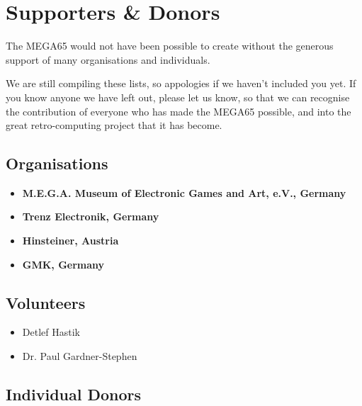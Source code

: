 \chapter{Supporters \& Donors}

The MEGA65 would not have been possible to create without the generous support
of many organisations and individuals.

We are still compiling these lists, so appologies if we haven't included you yet.  If you
know anyone we have left out, please let us know, so that we can recognise the contribution
of everyone who has made the MEGA65 possible, and into the great retro-computing project
that it has become.

\section{Organisations}

\begin{itemize}
\item {\bf M.E.G.A. Museum of Electronic Games and Art, e.V., Germany} 
\item {\bf Trenz Electronik, Germany} 
\item {\bf Hinsteiner, Austria} 
\item {\bf GMK, Germany} 
\end{itemize}

\section{Volunteers}

\begin{itemize}
\item Detlef Hastik    
\item Dr. Paul Gardner-Stephen   
\end{itemize}

\section{Individual Donors}


